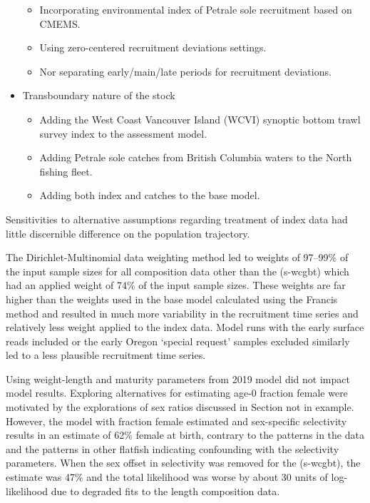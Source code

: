 \documentclass[
]{scrartcl}
\providecommand{\tightlist}{%
  \setlength{\itemsep}{0pt}\setlength{\parskip}{0pt}}\usepackage{longtable,booktabs,array}
\begin{document}
\begin{itemize}
  \begin{itemize}
  \tightlist
  \item
    Incorporating environmental index of Petrale sole recruitment based
    on CMEMS.
  \item
    Using zero-centered recruitment deviations settings.
  \item
    Nor separating early/main/late periods for recruitment deviations.
  \end{itemize}
\item
  Transboundary nature of the stock

  \begin{itemize}
  \tightlist
  \item
    Adding the West Coast Vancouver Island (WCVI) synoptic bottom trawl
    survey index to the assessment model.
  \item
    Adding Petrale sole catches from British Columbia waters to the
    North fishing fleet.
  \item
    Adding both index and catches to the base model.
  \end{itemize}
\end{itemize}

Sensitivities to alternative assumptions regarding treatment of index
data had little discernible difference on the population trajectory.

The Dirichlet-Multinomial data weighting method led to weights of
97--99\% of the input sample sizes for all composition data other than
the (\textsf{s-wcgbt}) which had an applied weight of 74\% of the input sample
sizes. These weights are far higher than the weights used in the base
model calculated using the Francis method and resulted in much more
variability in the recruitment time series and relatively less weight
applied to the index data. Model runs with the early surface reads
included or the early Oregon `special request' samples excluded
similarly led to a less plausible recruitment time series.

Using weight-length and maturity parameters from 2019 model did not
impact model results. Exploring alternatives for estimating age-0
fraction female were motivated by the explorations of sex ratios
discussed in Section not in example. However, the model with fraction
female estimated and sex-specific selectivity results in an estimate of
62\% female at birth, contrary to the patterns in the data and the
patterns in other flatfish indicating confounding with the selectivity
parameters. When the sex offset in selectivity was removed for the
(\textsf{s-wcgbt}), the estimate was 47\% and the total likelihood was worse by
about 30 units of log-likelihood due to degraded fits to the length
composition data.
\end{document}
